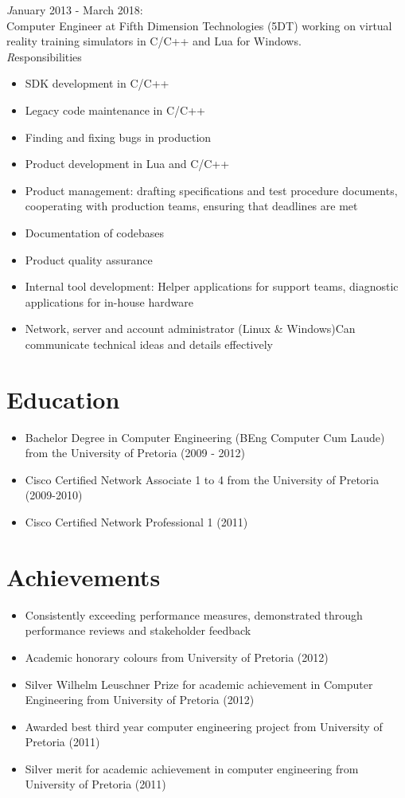 \documentclass[11pt,a4paper]{article}
\begin{document}
{\noindent\large\emph January 2013 - March 2018:}\\

	Computer Engineer at Fifth Dimension Technologies (5DT) working on virtual reality training simulators in C/C++ and Lua for Windows.\\

	
	{\emph Responsibilities}
	\begin{itemize}
		\item SDK development in C/C++
		\item Legacy code maintenance in C/C++
		\item Finding and fixing bugs in production
		\item Product development in Lua and C/C++
		\item Product management: drafting specifications and test procedure documents, cooperating with production teams, ensuring that deadlines are met 
		\item Documentation of codebases
		\item Product quality assurance		
		\item Internal tool development: Helper applications for support teams, diagnostic applications for in-house hardware 
		\item Network, server and account administrator (Linux \& Windows)Can communicate technical ideas and details effectively
	\end{itemize}

\section*{Education}
\begin{itemize}
	\item Bachelor Degree in Computer Engineering (BEng Computer Cum Laude) from the University of Pretoria (2009 - 2012) 
	\item Cisco Certified Network Associate 1 to 4 from the University of Pretoria (2009-2010)
	\item Cisco Certified Network Professional 1 (2011)

\end{itemize}	
	
\section*{Achievements}
\begin{itemize}
	\item Consistently exceeding performance measures, demonstrated through performance reviews and stakeholder feedback 
	\item Academic honorary colours from University of Pretoria (2012)
	\item Silver Wilhelm Leuschner Prize for academic achievement in Computer Engineering from University of Pretoria (2012) 
	\item Awarded best third year computer engineering project from University of Pretoria (2011) 
	\item Silver merit for academic achievement in computer engineering from University of Pretoria (2011) 
\end{itemize} 
\end{document}
